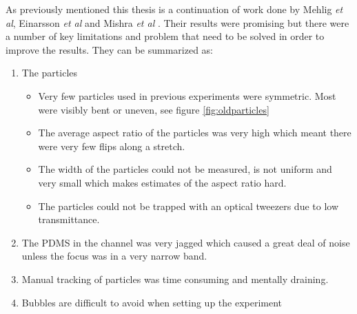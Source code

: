 As previously mentioned this thesis is a continuation of work done by Mehlig \emph{et al}, Einarsson \emph{et al} and Mishra \emph{et al} \cite{AntonThesis, JonasExperiment, Mishra}. Their results were promising but there were a number of key limitations and problem that need to be solved in order to improve the results. They can be summarized as:
\begin{enumerate}
	\item The particles 
	\begin{itemize}
		\item Very few particles used in previous experiments were symmetric. Most were visibly bent or uneven, see figure \ref{fig:oldparticles}
		\item The average aspect ratio of the particles was very high which meant there were very few flips along a stretch.
		\item The width of the particles could not be measured, is not uniform and very small which makes estimates of the aspect ratio hard.
		\item The particles could not be trapped with an optical tweezers due to low transmittance.
	\end{itemize}
	\item The PDMS in the channel was very jagged which caused a great deal 
			of noise unless the focus was in a very narrow band.
	\item Manual tracking of particles was time consuming and mentally draining.
	\item Bubbles are difficult to avoid when setting up the experiment
\end{enumerate}

